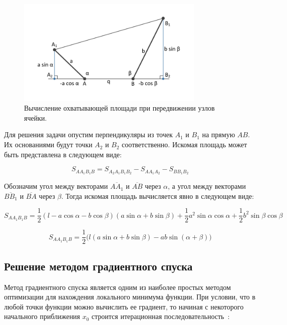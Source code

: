\documentclass[
11pt,%
tightenlines,%
twoside,%
onecolumn,%
nofloats,%
nobibnotes,%
nofootinbib,%
superscriptaddress,%
noshowpacs,%
centertags]%
{revtex4}
\begin{document}
\begin{figure}[h]
\setcaptionmargin{5mm}
\onelinecaptionstrue
\includegraphics[width=0.8\textwidth]{pics/local.pdf}
\caption{Вычисление охватывающей площади при передвижении узлов ячейки.}
\label{fig:local}
\end{figure}

Для решения задачи опустим перпендикуляры из точек $A_1$ и $B_1$ на прямую $AB$.
Их основаниями будут точки $A_2$ и $B_2$ соответственно.
Искомая площадь может быть представлена в следующем виде:

\begin{equation}
S_{AA_1B_1B} = S_{A_2A_1B_1B_2} - S_{AA_1A_2} - S_{BB_1B_2}
\end{equation}

Обозначим угол между векторами $\overline{AA_1}$ и $\overline{AB}$ через $\alpha$, а угол между векторами $\overline{BB_1}$ и $\overline{BA}$ через $\beta$.
Тогда искомая площадь вычисляется явно в следующем виде:

\begin{equation}
S_{AA_1B_1B} = \frac{1}{2}(l - a \cos \alpha - b \cos \beta)(a \sin \alpha + b \sin \beta) + \frac{1}{2}a^2 \sin \alpha \cos \alpha + \frac{1}{2}b^2 \sin \beta \cos \beta
\end{equation}

\begin{equation}
S_{AA_1B_1B} = \frac{1}{2}\big(l(a \sin \alpha + b \sin \beta) - ab \sin(\alpha + \beta)\big)
\end{equation}

\subsection{Решение методом градиентного спуска}

Метод градиентного спуска является одним из наиболее простых методом оптимизации для нахождения локального минимума функции.
При условии, что в любой точки функции можно вычислить ее градиент, то начиная с некоторого начального приближения $x_0$ строится итерационная последовательность~\cite{Kantorovich}:
\end{document}
